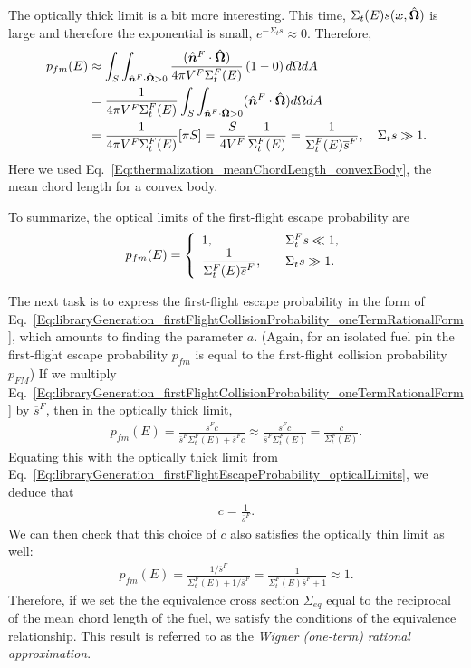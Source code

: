 The optically thick limit is a bit more interesting. This time, $\Sigma_t(E) s(\bm{x},\hat{\mathbf{\Omega}})$ is large and therefore the exponential is small, $e^{-\Sigma_t s} \approx 0$. Therefore,
\begin{align}
  p_{fm}(E) 
  &\approx \int_{S} \int_{\hat{\bm{n}}^F \cdot \hat{\mathbf{\Omega}} > 0} \frac{( \hat{\bm{n}}^F \cdot \hat{\mathbf{\Omega}} )}{4\pi V^F \Sigma_t^F(E)} \left( 1 - 0 \right) d\Omega dA \nonumber \\
  &= \frac{1}{ 4\pi V^F \Sigma_t^F(E) } \int_{S} \int_{\hat{\bm{n}}^F \cdot \hat{\mathbf{\Omega}} > 0} ( \hat{\bm{n}}^F \cdot \hat{\mathbf{\Omega}} ) d\Omega dA \nonumber \\
  &= \frac{1}{ 4\pi V^F \Sigma_t^F(E) } [ \pi S ] = \frac{S}{4V^F} \frac{1}{\Sigma_t^F(E)} = \frac{1}{\Sigma_t^F(E) \overline{s}^F} , \quad \Sigma_t s \gg 1 .
\end{align}
Here we used Eq.~\eqref{Eq:thermalization_meanChordLength_convexBody}, the mean chord length for a convex body.

To summarize, the optical limits of the first-flight escape probability are
\begin{align}
  p_{fm}(E) = \left\{ \begin{array}{l l}
  1, & \quad \Sigma_t^F s \ll 1, \\
  \dfrac{1}{\Sigma_t^F(E) \overline{s}^F}, & \quad \Sigma_t s \gg 1. \\ \end{array} \right. \label{Eq:libraryGeneration_firstFlightEscapeProbability_opticalLimits}
\end{align}

The next task is to express the first-flight escape probability in the form of Eq.~\eqref{Eq:libraryGeneration_firstFlightCollisionProbability_oneTermRationalForm}, which amounts to finding the parameter $a$. (Again, for an isolated fuel pin the first-flight escape probability $p_{fm}$ is equal to the first-flight collision probability $p_{FM}$) If we multiply Eq.~\eqref{Eq:libraryGeneration_firstFlightCollisionProbability_oneTermRationalForm} by $\overline{s}^F$, then in the optically thick limit,
\begin{align}
  p_{fm}(E) = \frac{ \overline{s}^F c }{ \overline{s}^F \Sigma_t^F(E) + \overline{s}^F c } \approx \frac{ \overline{s}^F c }{ \overline{s}^F \Sigma_t^F(E) } = \frac{c}{\Sigma_t^F(E)} .
\end{align}
Equating this with the optically thick limit from Eq.~\eqref{Eq:libraryGeneration_firstFlightEscapeProbability_opticalLimits}, we deduce that
\begin{align}
  c = \frac{1}{\overline{s}^F} .
\end{align}
We can then check that this choice of $c$ also satisfies the optically thin limit as well:
\begin{align}
  p_{fm}(E) = \frac{ 1/\overline{s}^F }{ \Sigma_t^F(E) + 1/\overline{s}^F  } = \frac{ 1 }{ \Sigma_t^F(E) \overline{s}^F  + 1 }  \approx 1 .
\end{align}
Therefore, if we set the the equivalence cross section $\Sigma_{eq}$ equal to the reciprocal of the mean chord length of the fuel, we satisfy the conditions of the equivalence relationship. This result is referred to as the \emph{Wigner (one-term) rational approximation}.

